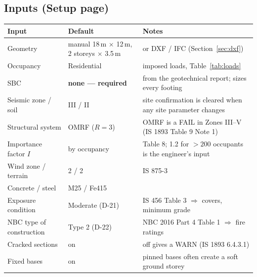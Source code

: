 \documentclass[10pt,a4paper]{article}
\begin{document}
\subsection{Inputs (Setup page)}
\begin{longtable}{L{44mm}L{40mm}L{76mm}}
\toprule \textbf{Input} & \textbf{Default} & \textbf{Notes} \\ \midrule \endhead
Geometry & manual 18\,m $\times$ 12\,m, 2 storeys $\times$ 3.5\,m & or DXF / IFC (Section~\ref{sec:dxf}) \\
Occupancy & Residential & imposed loads, Table~\ref{tab:loads} \\
SBC & \textbf{none --- required} & from the geotechnical report; sizes every footing \\
Seismic zone / soil & III / II & site confirmation is cleared when any site parameter changes \\
Structural system & OMRF ($R=3$) & OMRF is a FAIL in Zones III--V (IS 1893 Table 9 Note 1) \\
Importance factor $I$ & by occupancy & Table 8; 1.2 for $>200$ occupants is the engineer's input \\
Wind zone / terrain & 2 / 2 & IS 875-3 \\
Concrete / steel & M25 / Fe415 & \\
Exposure condition & Moderate (D-21) & IS 456 Table 3 $\Rightarrow$ covers, minimum grade \\
NBC type of construction & Type 2 (D-22) & NBC 2016 Part 4 Table 1 $\Rightarrow$ fire ratings \\
Cracked sections & on & off gives a WARN (IS 1893 6.4.3.1) \\
Fixed bases & on & pinned bases often create a soft ground storey \\
\bottomrule
\end{longtable}
\end{document}

